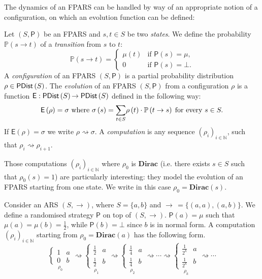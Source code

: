 The dynamics of an FPARS can be handled by way of an appropriate
notion of a configuration, on which an evolution function can be
defined:
\begin{definition}
	Let $\left( S,\mathsf{P}\right)$ be an FPARS and $s,t\in S$ be two
	\emph{states}. We define the probability $\mathbb{P}\left(s
	\rightarrow t\right)$ of a \emph{transition} from $s$ to $t$:
	$$
	\mathbb{P}\left(s \rightarrow t\right)=
	\begin{cases}
	\mu\left(t\right)&\mbox{if $\mathsf{P}\left(s\right)=\mu$},\\
	0&\mbox{if $\mathsf{P}\left(s\right)=\bot$}.
	\end{cases}
	$$
	A \emph{configuration} of an FPARS $\left( S,\mathsf{P}\right)$ is a partial probability distribution $\rho\in\textsf{PDist}\left(S\right)$.
	The \emph{evolution} of an FPARS $\left( S,\mathsf{P}\right)$ from a configuration $\rho$ is a function $\mathsf{E}:\textsf{PDist}\left(S\right){\rightarrow\textsf{PDist}\left(S\right)}$ defined in the following way:
	$$
	\mathsf{E}\left( \rho\right) = \sigma \textnormal{ where } \sigma\left(s\right)=\underset{t\in S}{\sum}\rho\left( t\right) \cdot\mathbb{P}\left(t \rightarrow s\right)\;\textnormal{for every }s \in S.
	$$
	If  $\mathsf{E}\left( \rho\right) = \sigma$ we write $\rho\rightsquigarrow\sigma$.
	A \emph{computation} is any sequence
	$(\rho_i)_{i\in\mathbb{N}}$, such that $\rho_i\rightsquigarrow\rho_{i+1}$.
\end{definition}
\begin{remark}
	Those computations $(\rho_i)_{i\in\mathbb{N}}$ where
	$\rho_0$ is $\mathbf{Dirac}$ (i.e. there exists $s\in S$ such that
	$\rho_0 (s)=1$) are particularly interesting: they model
	the evolution of an FPARS starting from one state. We write in this case
	$\rho_0=\mathbf{Dirac}(s)$.
\end{remark}
\begin{example}\label{example:pars}
	Consider an ARS $(S,\rightarrow)$, where $S=\{a,b\}$ and $\rightarrow\,=\{(a,a),(a,b)\}$. We define a randomised strategy $\mathsf{P}$ on top of $(S,\rightarrow)$. $\mathsf{P}(a)=\mu$ such that $\mu(a)=\mu(b)=\frac{1}{2}$, while $\mathsf{P}(b)=\bot$ since $b$ is in normal form. A computation $(\rho_i)_{i\in\mathbb{N}}$ starting from $\rho_0=\mathbf{Dirac}(a)$ has the following form.
	$$
	\underset{\rho_{0}}{\begin{cases}
		1 & a\\
		0 & b
		\end{cases}}\rightsquigarrow\underset{\rho_{1}}{\begin{cases}
		\frac{1}{2} & a\\
		\frac{1}{2} & b
		\end{cases}}\rightsquigarrow\underset{\rho_{2}}{\begin{cases}
		\frac{1}{4} & a\\
		\frac{1}{4} & b
		\end{cases}}\rightsquigarrow\cdots\rightsquigarrow\underset{\rho_{k}}{\begin{cases}
		\frac{1}{2^{k}} & a\\
		\frac{1}{2^{k}} & b
		\end{cases}}\rightsquigarrow\cdots
	$$
\end{example}
